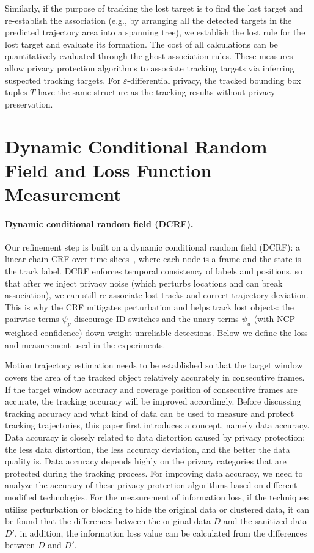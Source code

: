 \documentclass[trans]{IEEEtran}
\begin{document}
Similarly, if the purpose of tracking the lost target is to find the lost target and re-establish the association (e.g., by arranging all the detected targets in the predicted trajectory area into a spanning tree), we establish the lost rule for the lost target and evaluate its formation. The cost of all calculations can be quantitatively evaluated through the ghost association rules. These measures allow privacy protection algorithms to associate tracking targets via inferring suspected tracking targets. For $\varepsilon$-differential privacy, the tracked bounding box tuples $T$ have the same structure as the tracking results without privacy preservation.

\section{Dynamic Conditional Random Field and Loss Function Measurement} \label{informationlossmodel}
\paragraph{Dynamic conditional random field (DCRF).} Our refinement step is built on a dynamic conditional random field (DCRF): a linear-chain CRF over time slices~\cite{sutton2004dynamic}, where each node is a frame and the state is the track label. DCRF enforces temporal consistency of labels and positions, so that after we inject privacy noise (which perturbs locations and can break association), we can still re-associate lost tracks and correct trajectory deviation. This is why the CRF mitigates perturbation and helps track lost objects: the pairwise terms $\psi_p$ discourage ID switches and the unary terms $\psi_u$ (with NCP-weighted confidence) down-weight unreliable detections. Below we define the loss and measurement used in the experiments.

Motion trajectory estimation needs to be established so that the target window covers the area of the tracked object relatively accurately in consecutive frames. If the target window accuracy and coverage position of consecutive frames are accurate, the tracking accuracy will be improved accordingly. Before discussing tracking accuracy and what kind of data can be used to measure and protect tracking trajectories, this paper first introduces a concept, namely data accuracy. Data accuracy is closely related to data distortion caused by privacy protection: the less data distortion, the less accuracy deviation, and the better the data quality is. Data accuracy depends highly on the privacy categories that are protected during the tracking process. For improving data accuracy, we need to analyze the accuracy of these privacy protection algorithms based on different modified technologies. For the measurement of information loss, if the techniques utilize perturbation or blocking to hide the original data or clustered data, it can be found that the differences between the original data $D$ and the sanitized data $D'$, in addition, the information loss value can be calculated from the differences between  $D$ and  $D'$.
\end{document}
